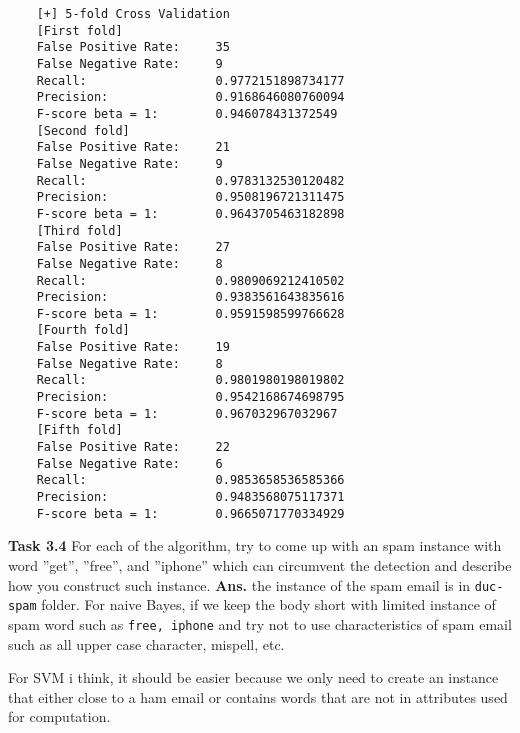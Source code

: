 \documentclass{article}
\begin{document}
\begin{verbatim}
    [+] 5-fold Cross Validation
    [First fold]
    False Positive Rate:     35
    False Negative Rate:	 9
    Recall:                  0.9772151898734177
    Precision:               0.9168646080760094
    F-score beta = 1:        0.946078431372549
    [Second fold]
    False Positive Rate:     21
    False Negative Rate:     9
    Recall:                  0.9783132530120482
    Precision:               0.9508196721311475
    F-score beta = 1:        0.9643705463182898
    [Third fold]
    False Positive Rate:     27
    False Negative Rate:     8
    Recall:                  0.9809069212410502
    Precision:               0.9383561643835616
    F-score beta = 1:        0.9591598599766628
    [Fourth fold]
    False Positive Rate:     19
    False Negative Rate:     8
    Recall:                  0.9801980198019802
    Precision:               0.9542168674698795
    F-score beta = 1:        0.967032967032967
    [Fifth fold]
    False Positive Rate:     22
    False Negative Rate:     6
    Recall:                  0.9853658536585366
    Precision:               0.9483568075117371
    F-score beta = 1:        0.9665071770334929
\end{verbatim}
\noindent\textbf{Task 3.4}  For each of the algorithm, try to come up with an spam instance with word ”get”, ”free”, and ”iphone”
which can circumvent the detection and describe how you construct such instance.
\textbf{Ans. } the instance of the spam email is in \texttt{duc-spam} folder. For naive Bayes, if we keep the body short with limited instance of spam word such as \texttt{free, iphone} and try not to use characteristics of spam email such as all upper case character, mispell, etc. 

For SVM i think, it should be easier because we only need to create an instance that either close to a ham email or contains words that are not in attributes used for computation.
\end{document}

